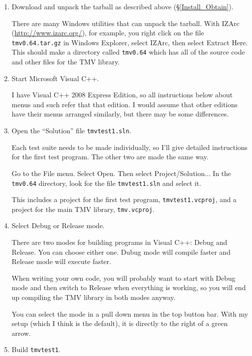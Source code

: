 \documentclass[twoside,letterpaper,11pt]{article}
\newcommand{\tmvversion}{0.64}
\begin{document}
\begin{enumerate}
\item Download and unpack the tarball as described above (\S\ref{Install_Obtain}).

There are many Windows utilities that can unpack the
tarball.  With IZArc (\url{http://www.izarc.org/}), for example, you right click on the file 
\texttt{tmv\tmvversion.tar.gz}
in Windows Explorer, select IZArc, then select Extract Here.  This should make a directory
called \texttt{tmv\tmvversion} which has all of the source code and other files for the TMV library.

\item
Start Microsoft Visual C++.  

I have Visual C++ 2008 Express Edition, so all instructions below
about menus and such refer that that edition.  I would assume that other editions have their 
menus arranged similarly, but there may be some differences.

\item
Open the ``Solution'' file \texttt{tmvtest1.sln}.

Each test suite needs to be made individually, so I'll give detailed instructions for the first
test program.  The other two are made the same way.

Go to the File menu.  Select Open.  Then select Project/Solution...
In the \texttt{tmv\tmvversion} directory, look for the file
\texttt{tmvtest1.sln} and select it.  

This includes a project for the first test program, \texttt{tmvtest1.vcproj}, and a project for
the main TMV library, \texttt{tmv.vcproj}.

\item
Select Debug or Release mode.

There are two modes for building programs in Visual C++: Debug and Release.  
You can choose either one.  Dubug mode will compile faster and 
Release mode will execute faster.  

When writing 
your own code, you will probably want to start with Debug mode and then switch to Release
when everything is working, so you will end up compiling the TMV library in both modes anyway.

You can select the mode in a pull down menu in the top button bar.  With my setup
(which I think is the default), it is directly to the right of a green arrow.

\item
Build \texttt{tmvtest1}.


\end{enumerate}
\end{document}
